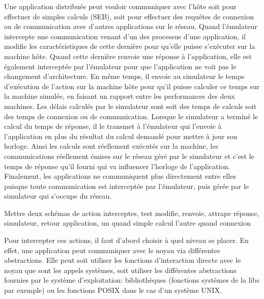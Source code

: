  Une application distribuée peut vouloir communiquer avec l'hôte soit pour
 effectuer de simples calculs (SEB), soit pour effectuer des requêtes de
 connexion ou de communication avec d'autres applications sur le réseau. Quand
 l'émulateur intercepte une communication venant d'un des processus d'une
 application, il modifie les caractéristiques de cette dernière pour qu'elle
 puisse s'exécuter sur la machine hôte. Quand cette dernière renvoie une réponse
 à l'application, elle est également interceptée par l'émulateur pour que
 l'application ne voit pas le changement d'architecture. En même temps, il
 envoie au simulateur le temps d'exécution de l'action sur la machine hôte pour
 qu'il puisse calculer ce temps sur la machine simulée, en faisant un rapport
 entre les performances des deux machines. Les délais calculés par le simulateur
 sont soit des temps de calculs soit des temps de connexion ou de
 communication. Lorsque le simulateur a terminé le calcul du temps de réponse,
 il le transmet à l'émulateur qui l'envoie à l'application en plus du résultat
 du calcul demandé pour mettre à jour son horloge.  Ainsi les calculs sont
 réellement exécutés sur la machine, les communications réellement émises sur le
 réseau géré par le simulateur et c'est le temps de réponse qu'il fourni qui va
 influencer l'horloge de l'application. Finalement, les applications ne
 communiquent plus directement entre elles puisque toute communication est
 interceptée par l'émulateur, puis gérée par le simulateur qui s'occupe du
 réseau.

{\color{red} Mettre deux schémas de action interceptes, test modifie, renvoie,
  attrape réponse, simulateur, retour application, un quand simple calcul
  l'autre quand connexion}

Pour intercepter ces actions, il faut d'abord choisir à quel niveau se placer.
 En effet, une application peut communiquer avec le noyau via différentes
abstractions. Elle peut soit utiliser les fonctions d'interaction directe avec
le noyau que sont les appels systèmes, soit utiliser les différentes
abstractions fournies par le système d'exploitation: bibliothèques (fonctions
systèmes de la libc par exemple) ou les fonctions POSIX dans le cas d'un système
UNIX.

